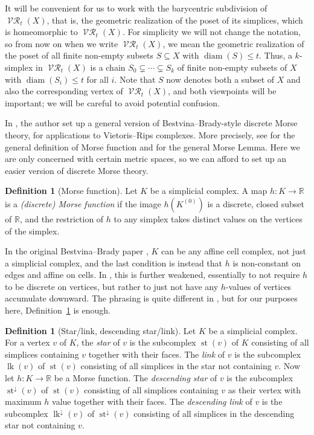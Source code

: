 \documentclass[a4paper,11pt]{amsart}
\theoremstyle{definition}
\newtheorem{definition}[theorem]{Definition}
\newcommand{\R}{\mathbb{R}}
\DeclareMathOperator{\diam}{diam}
\DeclareMathOperator{\Rips}{\mathcal{VR}}
\newcommand{\lk}{\operatorname{lk}}
\newcommand{\st}{\operatorname{st}}
\newcommand{\dst}{\st^\downarrow\!}
\newcommand{\dlk}{\lk^\downarrow\!}
\numberwithin{equation}{section}
\begin{document}
It will be convenient for us to work with the barycentric subdivision of $\Rips_t(X)$, that is, the geometric realization of the poset of its simplices, which is homeomorphic to $\Rips_t(X)$. For simplicity we will not change the notation, so from now on when we write $\Rips_t(X)$, we mean the geometric realization of the poset of all finite non-empty subsets $S\subseteq X$ with $\diam(S)\le t$. Thus, a $k$-simplex in $\Rips_t(X)$ is a chain $S_0\subsetneq \cdots\subsetneq S_k$ of finite non-empty subsets of $X$ with $\diam(S_i)\le t$ for all $i$. Note that $S$ now denotes both a subset of $X$ and also the corresponding vertex of $\Rips_t(X)$, and both viewpoints will be important; we will be careful to avoid potential confusion.

In \cite{zaremsky22}, the author set up a general version of Bestvina--Brady-style discrete Morse theory, for applications to Vietoris--Rips complexes. More precisely, see \cite[Definition~1.1]{zaremsky22} for the general definition of Morse function and \cite[Lemma~1.8]{zaremsky22} for the general Morse Lemma. Here we are only concerned with certain metric spaces, so we can afford to set up an easier version of discrete Morse theory.

\begin{definition}[Morse function]\label{def:morse}
Let $K$ be a simplicial complex. A map $h\colon K\to\R$ is a \emph{(discrete) Morse function} if the image $h(K^{(0)})$ is a discrete, closed subset of $\R$, and the restriction of $h$ to any simplex takes distinct values on the vertices of the simplex.
\end{definition}

In the original Bestvina--Brady paper \cite{bestvina97}, $K$ can be any affine cell complex, not just a simplicial complex, and the last condition is instead that $h$ is non-constant on edges and affine on cells. In \cite[Definition~1.1]{zaremsky22}, this is further weakened, essentially to not require $h$ to be discrete on vertices, but rather to just not have any $h$-values of vertices accumulate downward. The phrasing is quite different in \cite{zaremsky22}, but for our purposes here, Definition~\ref{def:morse} is enough.

\begin{definition}[Star/link, descending star/link]
Let $K$ be a simplicial complex. For a vertex $v$ of $K$, the \emph{star} of $v$ is the subcomplex $\st(v)$ of $K$ consisting of all simplices containing $v$ together with their faces. The \emph{link} of $v$ is the subcomplex $\lk(v)$ of $\st(v)$ consisting of all simplices in the star not containing $v$. Now let $h\colon K\to\R$ be a Morse function. The \emph{descending star} of $v$ is the subcomplex $\dst(v)$ of $\st(v)$ consisting of all simplices containing $v$ as their vertex with maximum $h$ value together with their faces. The \emph{descending link} of $v$ is the subcomplex $\dlk(v)$ of $\dst(v)$ consisting of all simplices in the descending star not containing $v$.
\end{definition}
\end{document}
